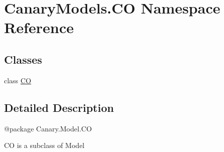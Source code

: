 \hypertarget{namespace_canary_models_1_1_c_o}{\section{Canary\-Models.\-C\-O Namespace Reference}
\label{namespace_canary_models_1_1_c_o}
}
\subsection*{Classes}
\begin{DoxyCompactItemize}
\item 
class \hyperlink{class_canary_models_1_1_c_o_1_1_c_o}{C\-O}
\end{DoxyCompactItemize}


\subsection{Detailed Description}
\begin{DoxyVerb}@package Canary.Model.CO

CO is a subclass of Model
\end{DoxyVerb}
 